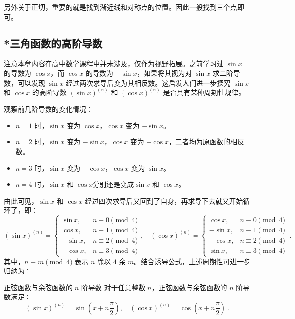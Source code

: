 另外关于正切，重要的就是找到渐近线和对称点的位置。因此一般找到三个点即可。

\subsection{*三角函数的高阶导数}


注意本章内容在高中数学课程中并未涉及，仅作为视野拓展。之前学习过 $\sin x$ 的导数为 $\cos x$，而 $\cos x$ 的导数为 $-\sin x$，如果将其视为对 $\sin x$ 求二阶导数，可以发现 $\sin x$ 经过两次求导后变为其相反数。这启发人们进一步探究 $\sin x$ 和 $\cos x$ 的高阶导数 $(\sin x)^{(n)}$ 和 $(\cos x)^{(n)}$ 是否具有某种周期性规律。

观察前几阶导数的变化情况：
\begin{itemize}
\item $n = 1$ 时，$\sin x$ 变为 $\cos x$，$\cos x$ 变为 $-\sin x$。
\item $n = 2$ 时，$\sin x$ 变为 $-\sin x$，$\cos x$ 变为 $-\cos x$，二者均为原函数的相反数。
\item $n = 3$ 时，$\sin x$ 变为 $-\cos x$，$\cos x$ 变为 $\sin x$。
\item $n = 4$ 时，$\sin x$ 和 $\cos x$分别还是变成$\sin x$ 和 $\cos x$。
\end{itemize}
由此可见，$\sin x$ 和 $\cos x$ 经过四次求导后又回到了自身，再求导下去就又开始循环了，即：
\begin{equation}\label{eq_HsSinF_2}
(\sin x)^{(n)}  =
\begin{cases}
\sin x, & n \equiv 0 \pmod{4} \\
\cos x, & n \equiv 1 \pmod{4} \\
-\sin x, & n \equiv 2 \pmod{4} \\
-\cos x, & n \equiv 3 \pmod{4}
\end{cases},\quad(\cos x)^{(n)} =
\begin{cases}
\cos x, & n \equiv 0 \pmod{4} \\
-\sin x, & n \equiv 1 \pmod{4} \\
-\cos x, & n \equiv 2 \pmod{4} \\
\sin x, & n \equiv 3 \pmod{4}
\end{cases}~.
\end{equation}
其中，$n \equiv m \pmod{4}$ 表示 $n$ 除以 $4$ 余 $m$。结合诱导公式，上述周期性可进一步归纳为：

\begin{corollary}{正弦函数与余弦函数的 $n$ 阶导数}
对于任意整数 $n$，正弦函数与余弦函数的 $n$ 阶导数满足：
\begin{equation}
(\sin x)^{(n)} = \sin\left(x + n\frac{\pi}{2}\right), \quad
(\cos x)^{(n)} = \cos\left(x + n\frac{\pi}{2}\right)~.
\end{equation}
\end{corollary}

